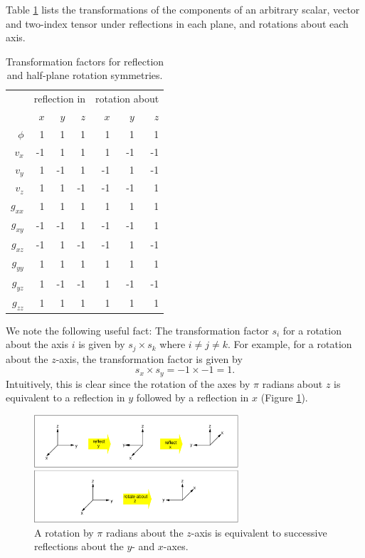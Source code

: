\documentclass{article}
\newif\ifpdf
\begin{document}
Table \ref{tbl:rs_xform} lists the transformations of the components
of an arbitrary scalar, vector and two-index tensor under reflections
in each plane, and rotations about each axis.
\begin{table}
\centering
\begin{tabular}{r|rrr|rrr}\hline\hline
         & \multicolumn{3}{c|}{reflection in} 
         & \multicolumn{3}{c}{rotation about} \\
         & $x$ & $y$ & $z$ & $x$ & $y$ & $z$ \\ \hline
$\phi$   &  1  &  1  &  1  &  1  &  1  &  1  \\ \hline
$v_x$    & -1  &  1  &  1  &  1  & -1  & -1  \\
$v_y$    &  1  & -1  &  1  & -1  &  1  & -1  \\
$v_z$    &  1  &  1  & -1  & -1  & -1  &  1  \\ \hline
$g_{xx}$ &  1  &  1  &  1  &  1  &  1  &  1  \\  
$g_{xy}$ & -1  & -1  &  1  & -1  & -1  &  1  \\  
$g_{xz}$ & -1  &  1  & -1  & -1  &  1  & -1  \\  
$g_{yy}$ &  1  &  1  &  1  &  1  &  1  &  1  \\  
$g_{yz}$ &  1  & -1  & -1  &  1  & -1  & -1  \\  
$g_{zz}$ &  1  &  1  &  1  &  1  &  1  &  1  \\ \hline\hline
\end{tabular}
\caption{Transformation factors for reflection and half-plane rotation
symmetries.}
\label{tbl:rs_xform}
\end{table}
We note the following useful fact: The transformation factor $s_i$ for
a rotation about the axis $i$ is given by $s_j \times s_k$ where
$i\neq j\neq k$. For example, for a rotation about the $z$-axis, the
transformation factor is given by
\begin{equation}
  s_x \times s_y = -1 \times -1 = 1.
\end{equation}
Intuitively, this is clear since the rotation of the axes by $\pi$
radians about $z$ is equivalent to a reflection in $y$ followed by
a reflection in $x$ (Figure \ref{fig:rs_rotate_reflect}).\\

\begin{figure}
\centering
\ifpdf
\else
\includegraphics[height=40mm]{fig/rotate_reflect.eps}
\fi
\caption{A rotation by $\pi$ radians about the $z$-axis is equivalent
  to successive reflections about the $y$- and $x$-axes.}
\label{fig:rs_rotate_reflect}
\end{figure}
\end{document}
